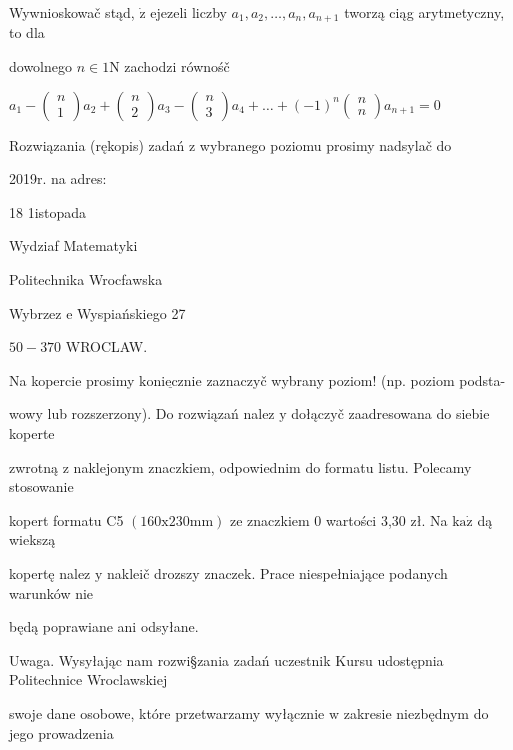 \documentclass[a4paper,12pt]{article}
\begin{document}
Wywnioskowač stąd, $\dot{\mathrm{z}}$ ejezeli liczby $a_{1}, a_{2}, \ldots, a_{n}, a_{n+1}$ tworzą ciąg arytmetyczny, to dla

dowolnego $n\in 1\mathrm{N}$ zachodzi równośč

$a_{1}-\left(\begin{array}{l}
n\\
1
\end{array}\right)a_{2}+\left(\begin{array}{l}
n\\
2
\end{array}\right)a_{3}-\left(\begin{array}{l}
n\\
3
\end{array}\right)a_{4}+\ldots+(-1)^{n}\left(\begin{array}{l}
n\\
n
\end{array}\right)a_{n+1}=0$

Rozwiązania (rękopis) zadań z wybranego poziomu prosimy nadsylač do

2019r. na adres:

18 1istopada

Wydziaf Matematyki

Politechnika Wrocfawska

Wybrzez $\mathrm{e}$ Wyspiańskiego 27

$50-370$ WROCLAW.

Na kopercie prosimy $\underline{\mathrm{k}\mathrm{o}\mathrm{n}\mathrm{i}\mathrm{e}\mathrm{c}\mathrm{z}\mathrm{n}\mathrm{i}\mathrm{e}}$ zaznaczyč wybrany poziom! (np. poziom podsta-

wowy lub rozszerzony). Do rozwiązań nalez $\mathrm{y}$ dołączyč zaadresowana do siebie koperte

zwrotną $\mathrm{z}$ naklejonym znaczkiem, odpowiednim do formatu listu. Polecamy stosowanie

kopert formatu C5 $(160\mathrm{x}230\mathrm{m}\mathrm{m})$ ze znaczkiem $0$ wartości 3,30 zł. Na $\mathrm{k}\mathrm{a}\dot{\mathrm{z}}$ dą wiekszą

kopertę nalez $\mathrm{y}$ nakleič drozszy znaczek. Prace niespełniające podanych warunków nie

będą poprawiane ani odsyłane.

Uwaga. Wysyłając nam rozwi\S zania zadań uczestnik Kursu udostępnia Politechnice Wroclawskiej

swoje dane osobowe, które przetwarzamy wyłącznie $\mathrm{w}$ zakresie niezbędnym do jego prowadzenia
\end{document}
